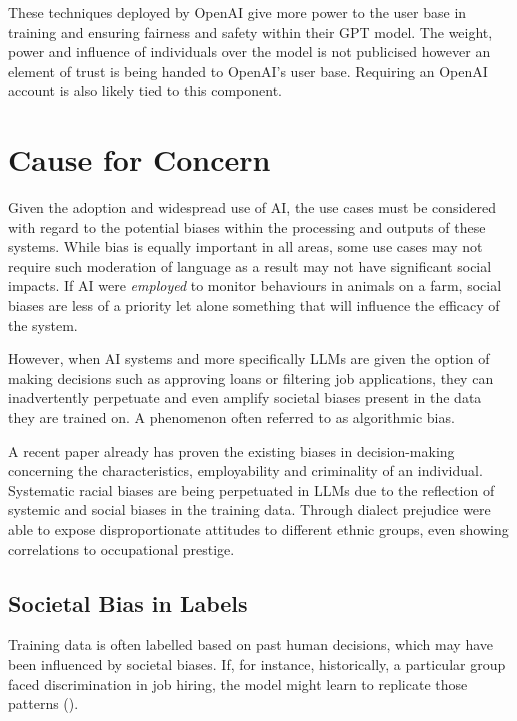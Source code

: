 \documentclass[12pt]{article}
\begin{document}
These techniques deployed by OpenAI give more power to the user base in training and ensuring fairness and safety within their GPT model. The weight, power and influence of individuals over the model is not publicised however an element of trust is being handed to OpenAI's user base. Requiring an OpenAI account is also likely tied to this component.

\newpage

\section{Cause for Concern}

Given the adoption and widespread use of AI, the use cases must be considered with regard to the potential biases within the processing and outputs of these systems. While bias is equally important in all areas, some use cases may not require such moderation of language as a result may not have significant social impacts. If AI were \textit{employed} to monitor behaviours in animals on a farm, social biases are less of a priority let alone something that will influence the efficacy of the system.

However, when AI systems and more specifically LLMs are given the option of making decisions such as approving loans or filtering job applications, they can inadvertently perpetuate and even amplify societal biases present in the data they are trained on. A phenomenon often referred to as algorithmic bias.

A recent paper already has proven the existing biases in decision-making concerning the characteristics, employability and criminality of an individual. Systematic racial biases are being perpetuated in LLMs due to the reflection of systemic and social biases in the training data. Through dialect prejudice \cite{hofmann-2024} were able to expose disproportionate attitudes to different ethnic groups, even showing correlations to occupational prestige. 

\subsection{Societal Bias in Labels}

Training data is often labelled based on past human decisions, which may have been influenced by societal biases. If, for instance, historically, a particular group faced discrimination in job hiring, the model might learn to replicate those patterns (\cite{hovy-2021}).
\end{document}
